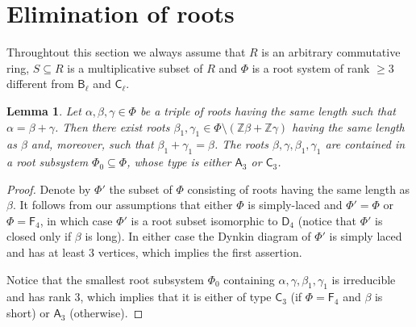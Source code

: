\documentclass[oneside, 11pt]{amsart}
\numberwithin{equation}{section}
\newtheorem{lemma}{Lemma} \numberwithin{lemma}{section}
\theoremstyle{definition}
\theoremstyle{remark}
\newcommand{\ZZ}{\mathbb{Z}}
\newcommand{\rA}{\mathsf{A}}
\newcommand{\rB}{\mathsf{B}}
\newcommand{\rC}{\mathsf{C}}
\newcommand{\rD}{\mathsf{D}}
\newcommand{\rF}{\mathsf{F}}
\begin{document}
\section{Elimination of roots}
Throughtout this section we always assume that \(R\) is an arbitrary commutative ring, 
 \(S \subseteq R\) is a multiplicative subset of $R$ and \(\Phi\) is a root system of rank \(\geq 3\) different from \(\rB_\ell\) and \(\rC_\ell\). 

\begin{lemma}\label{ThreeRoots}
Let \(\alpha, \beta, \gamma \in \Phi\) be a triple of roots having the same length such that $\alpha = \beta + \gamma$.  
Then there exist roots \(\beta_1, \gamma_1 \in \Phi \setminus (\ZZ\beta + \ZZ\gamma)\) having the same length as $\beta$ and, moreover, such that \(\beta_1 + \gamma_1 = \beta\). The roots $\beta, \gamma, \beta_1, \gamma_1$ are contained in a root subsystem $\Phi_0 \subseteq \Phi$, whose type is either \(\rA_3\) or \(\rC_3\). \end{lemma}
\begin{proof}
Denote by $\Phi'$ the subset of $\Phi$ consisting of roots having the same length as $\beta$.
It follows from our assumptions that either $\Phi$ is simply-laced and $\Phi' = \Phi$ or $\Phi = \rF_4$, in which case $\Phi'$ is a root subset isomorphic to $\rD_4$ (notice that $\Phi'$ is closed only if $\beta$ is long). In either case the Dynkin diagram of $\Phi'$ is simply laced and has at least $3$ vertices, which implies the first assertion.

Notice that the smallest root subsystem $\Phi_0$ containing $\alpha, \gamma, \beta_1, \gamma_1$ is irreducible and has rank $3$, which implies that it is either of type  $\rC_3$ (if $\Phi = \rF_4$ and $\beta$ is short) or $\rA_3$ (otherwise). \end{proof}
\end{document}
